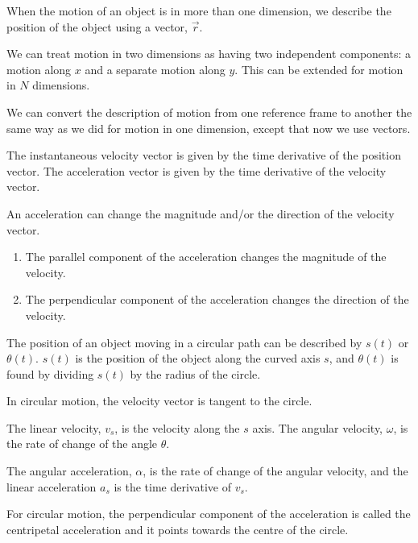 \begin{chapterSummary}{
\item When the motion of an object is in more than one dimension, we describe the position of the object using a vector, $\vec{r}$.

\item We can treat motion in two dimensions as having two independent components: a motion along $x$ and  a separate motion along $y$. This can be extended for motion in $N$ dimensions.

\item We can convert the description of motion from one reference frame to another the same way as we did for motion in one dimension, except that now we use vectors.

\item The instantaneous velocity vector is given by the time derivative of the position vector. The acceleration vector is given by the time derivative of the velocity vector.
\item An acceleration can change the magnitude and/or the direction of the velocity vector.
\begin{enumerate}
\item The parallel component of the acceleration changes the magnitude of the velocity.
\item The perpendicular component of the acceleration changes the direction of the velocity.
\end{enumerate}

\item The position of an object moving in a circular path can be described by $s(t)$ or $\theta (t)$. $s(t)$ is the position of the object along the curved axis $s$, and $\theta (t)$ is found by dividing $s(t)$ by the radius of the circle.

\item In circular motion, the velocity vector is tangent to the circle.

\item The linear velocity, $v_s$, is the velocity along the $s$ axis. The angular velocity, $\omega$, is the rate of change of the angle $\theta$. 

\item The angular acceleration, $\alpha$, is the rate of change of the angular velocity, and the linear acceleration $a_s$ is the time derivative of $v_s$.

\item For circular motion, the perpendicular component of the acceleration is called the centripetal acceleration and it points towards the centre of the circle.

}
\end{chapterSummary}
